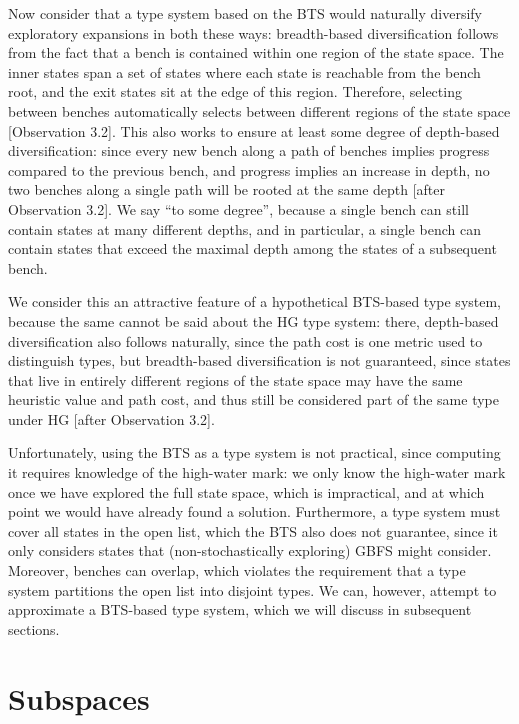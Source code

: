 Now consider that a type system based on the BTS would naturally diversify exploratory expansions in both these ways: breadth-based diversification follows from the fact that a bench is contained within one region of the state space. The inner states span a set of states where each state is reachable from the bench root, and the exit states sit at the edge of this region. Therefore, selecting between benches automatically selects between different regions of the state space [Observation 3.2]. This also works to ensure at least some degree of depth-based diversification: since every new bench along a path of benches implies progress compared to the previous bench, and progress implies an increase in depth, no two benches along a single path will be rooted at the same depth [after Observation 3.2]. We say ``to some degree'', because a single bench can still contain states at many different depths, and in particular, a single bench can contain states that exceed the maximal depth among the states of a subsequent bench.

We consider this an attractive feature of a hypothetical BTS-based type system, because the same cannot be said about the HG type system: there, depth-based diversification also follows naturally, since the path cost is one metric used to distinguish types, but breadth-based diversification is not guaranteed, since states that live in entirely different regions of the state space may have the same heuristic value and path cost, and thus still be considered part of the same type under HG [after Observation 3.2].

Unfortunately, using the BTS as a type system is not practical, since computing it requires knowledge of the high-water mark: we only know the high-water mark once we have explored the full state space, which is impractical, and at which point we would have already found a solution. Furthermore, a type system must cover all states in the open list, which the BTS also does not guarantee, since it only considers states that (non-stochastically exploring) GBFS might consider. Moreover, benches can overlap, which violates the requirement that a type system partitions the open list into disjoint types. We can, however, attempt to approximate a BTS-based type system, which we will discuss in subsequent sections.

\section{Subspaces}

